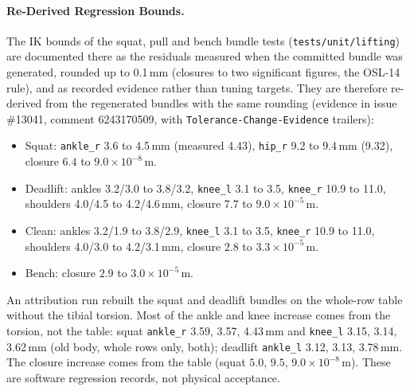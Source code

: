 \documentclass[11pt,a4paper]{article}
\begin{document}
\paragraph{Re-Derived Regression Bounds.} The IK bounds of the squat, pull
and bench bundle tests (\texttt{tests/unit/lifting}) are documented there as
the residuals
measured when the committed bundle was generated, rounded up to 0.1\,mm
(closures to two significant figures, the OSL-14 rule), and as recorded
evidence rather than tuning targets. They are therefore re-derived from the
regenerated bundles with the same rounding (evidence in issue \#13041,
comment 6243170509, with \texttt{Tolerance-Change-Evidence} trailers):
\begin{itemize}[nosep]
\item Squat: \texttt{ankle\_r} 3.6 to 4.5\,mm (measured 4.43), \texttt{hip\_r}
  9.2 to 9.4\,mm (9.32), closure $6.4$ to $9.0\times10^{-8}$\,m.
\item Deadlift: ankles 3.2/3.0 to 3.8/3.2, \texttt{knee\_l} 3.1 to 3.5,
  \texttt{knee\_r} 10.9 to 11.0, shoulders 4.0/4.5 to 4.2/4.6\,mm, closure
  $7.7$ to $9.0\times10^{-5}$\,m.
\item Clean: ankles 3.2/1.9 to 3.8/2.9, \texttt{knee\_l} 3.1 to 3.5,
  \texttt{knee\_r} 10.9 to 11.0, shoulders 4.0/3.0 to 4.2/3.1\,mm, closure
  $2.8$ to $3.3\times10^{-5}$\,m.
\item Bench: closure $2.9$ to $3.0\times10^{-5}$\,m.
\end{itemize}
An attribution run rebuilt the squat and deadlift bundles on the whole-row
table without the tibial torsion. Most of the ankle and knee increase comes
from the torsion, not the table: squat \texttt{ankle\_r} 3.59, 3.57, 4.43\,mm
and \texttt{knee\_l} 3.15, 3.14, 3.62\,mm (old body, whole rows only, both);
deadlift \texttt{ankle\_l} 3.12, 3.13, 3.78\,mm. The closure increase comes
from the table (squat $5.0$, $9.5$, $9.0\times10^{-8}$\,m). These are
software regression records, not physical acceptance.
\end{document}
